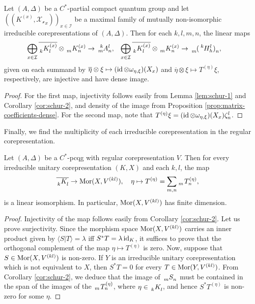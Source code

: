 \begin{Cor} \label{cor:pw}
  Let $(A,\Delta)$ be a $C^{*}$-partial compact quantum group and let
  $((K^{(x)}, \mathscr{X_{x}}_{x}))_{x \in \mathcal{I}}$ be a maximal
  family of mutually non-isomorphic irreducible corepresentations of
  $(A,\Delta)$.  Then for each $k,l,m,n$, the linear maps
      \begin{align*}
        \label{eq:1}
        \bigoplus_{x\in \mathcal{I}} 
        \overline{\Gr{K}{}{(x)}{k}{l}} \otimes \Gr{K}{}{(x)}{m}{n} &\to
        \Gr{A}{k}{l}{m}{n}, &
        \bigoplus_{x\in \mathcal{I}} 
        \overline{\Gr{K}{}{(x)}{k}{l}} \otimes \Gr{K}{}{(x)}{m}{n} &\to
        \Grd{{(\Gr{H}{k}{l}{}{h})}}{m}{n}, &
      \end{align*}
      given on each summand by $\overline{\eta} \otimes \xi \mapsto (\operatorname{id} \otimes
      \omega_{\eta,\xi})(X_{x})$ and $\overline{\eta} \otimes \xi \mapsto T^{(\eta)}\xi$, respectively,  are injective and
      have dense image.
\end{Cor}
\begin{proof}
For the first map, injectivity   follows easily from Lemma  \eqref{lem:schur-1} and Corollary \ref{cor:schur-2}, and density  of the image from Proposition \ref{prop:matrix-coefficients-dense}. For the second map, note that $T^{(\eta)}\xi = (\operatorname{id} \otimes
      \omega_{\eta,\xi})(X_{x})\zeta^{l}_{n}$.
\end{proof}
 Finally, we find the multiplicity of each irreducible corepresentation in the regular corepresentation. 
\begin{Cor} 
Let $(A,\Delta)$ be a $C^{*}$-pcqg with regular corepresentation $V$. Then for every irreducible unitary corepresentation   $(K,X)$ and each $k,l$, the map
  \begin{align*}
\overline{ \Grd{K}{k}{l}} \to \Mor(X,V^{(kl)}), \quad \eta \mapsto T^{(\eta)} = \sum_{m,n} \Gr{T}{}{(\eta)}{m}{n},
  \end{align*}
  is a linear isomorphism. In particular, $\mathrm{Mor}(X,V^{(kl)})$ has finite dimension.
\end{Cor}
\begin{proof}
  Injectivity of the map follows easily from Corollary \ref{cor:schur-2}.  Let us prove surjectivity.  Since the morphism space
  $\mathrm{Mor}(X,V^{(kl)})$ carries an inner product given by $\langle
  S|T\rangle =\lambda$ iff $S^{*}T=\lambda \operatorname{id}_{K}$, it suffices to  prove that the orthogonal complement of the map $\eta\mapsto
  T^{(\eta)}$ is zero. Now,  suppose that $S \in \mathrm{Mor}(X,V^{(kl)})$ is non-zero. If $Y$ is an  irreducible unitary corepresentation which is not equivalent to $X$, then $S^{*}T=0$    for every $T \in \mathrm{Mor}(Y,V^{(kl)})$. From  Corollary \ref{cor:schur-2}, we deduce that the image of  $\Grd{S}{m}{n}$ must be contained in the span of the images of the  $\Gr{T}{}{(\eta)}{m}{n}$, where $\eta \in \Grd{K}{k}{l}$, and hence  $S^{*}T^{(\eta)}$ is non-zero for some $\eta$.
\end{proof}


